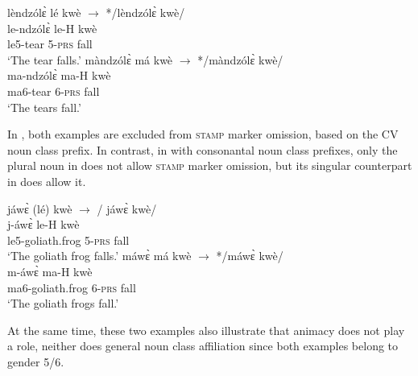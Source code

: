 


\ea \label{NCOM1}
  \ea  \label{NCOM1a}
   \glll   lèndzólɛ̀ lé kwè   $\rightarrow$ */lèndzólɛ̀ kwè/ \\
          le-ndzólɛ̀ le-H kwè   \\
            le5-tear 5-\textsc{prs} fall  \\
    \trans `The tear falls.'
\ex\label{NCOM1b}
\glll   màndzólɛ̀ má kwè   $\rightarrow$ */màndzólɛ̀ kwè/ \\
          ma-ndzólɛ̀ ma-H kwè   \\
            ma6-tear 6-\textsc{prs} fall  \\
    \trans `The tears fall.' 
\z
\z

In , both examples are excluded from \textsc{stamp} marker omission, based on the CV noun class prefix. In contrast, in  with consonantal noun class prefixes,  only the plural noun in  does not allow \textsc{stamp} marker omission, but its singular counterpart in  does allow it.

\ea \label{NCOM2}
  \ea  \label{NCOM2a}
   \glll    jáwɛ̀ (lé) kwè  $\rightarrow$ / jáwɛ̀ kwè/ \\
             j-áwɛ̀ le-H kwè  \\
            le5-goliath.frog 5-\textsc{prs} fall  \\
    \trans `The goliath frog falls.'
\ex\label{NCOM2b}
\glll   máwɛ̀ má kwè   $\rightarrow$ */máwɛ̀ kwè/ \\
          m-áwɛ̀ ma-H kwè   \\
            ma6-goliath.frog 6-\textsc{prs} fall  \\
    \trans `The goliath frogs fall.' 
\z
\z

\noindent At the same time, these two examples also illustrate that animacy does not play a role, neither does general noun class affiliation since both examples belong to gender 5/6.

